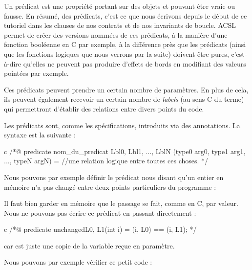 Un prédicat est une propriété portant sur des objets et pouvant être vraie ou
fausse. En résumé, des prédicats, c'est ce que nous écrivons depuis le début de
ce tutoriel dans les clauses de nos contrats et de nos invariants de boucle.
ACSL permet de créer des versions nommées de ces prédicats, à la manière
d'une fonction booléenne en C par exemple, à la différence près que
les prédicats (ainsi que les fonctions logiques que nous verrons par la suite)
doivent être pures, c'est-à-dire qu'elles ne peuvent pas produire d'effets de
bords en modifiant des valeurs pointées par exemple.



Ces prédicats peuvent prendre un certain nombre de paramètres. En plus de cela,
ils peuvent également recevoir un certain nombre de \textit{labels} (au sens C du terme)
qui permettront d'établir des relations entre divers points du code.





Les prédicats sont, comme les spécifications, introduits via des
annotations. La syntaxe est la suivante :



\begin{CodeBlock}{c}
  /*@
  predicate nom_du_predicat { Lbl0, Lbl1, ..., LblN }(type0 arg0, type1 arg1, ..., typeN argN) =
  //une relation logique entre toutes ces choses.
  */
\end{CodeBlock}



Nous pouvons par exemple définir le prédicat nous disant qu'un entier en mémoire n'a
pas changé entre deux points particuliers du programme :




\begin{Warning}
  Il faut bien garder en mémoire que le passage se fait, comme en C, par valeur.
  Nous ne pouvons pas écrire ce prédicat en passant directement  :

  \begin{CodeBlock}{c}
    /*@
      predicate unchanged{L0, L1}(int i) =
        \at(i, L0) == \at(i, L1);
    */
  \end{CodeBlock}

  car  est juste une copie de la variable reçue en paramètre.
\end{Warning}


Nous pouvons par exemple vérifier ce petit code :



